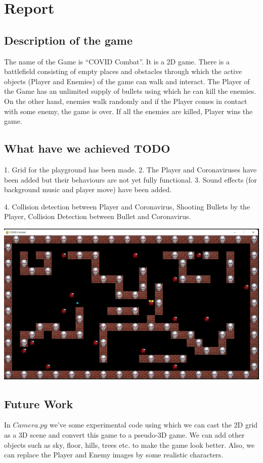 \chapter{Report}

\section{Description of the game}
The name of the Game is “COVID Combat”. It is a 2D game. There is a battlefield consisting of empty places and obstacles through which the active objects (Player and Enemies) of the game can walk and interact. The Player of the Game has an unlimited supply of bullets using which he can kill the enemies. On the other hand, enemies walk randomly and if the Player comes in contact with some enemy, the game is over. If all the enemies are killed, Player wins the game.

\section{What have we achieved TODO}
1.	Grid for the playground has been made.
2.	The Player and Coronaviruses have been added but their behaviours are not yet fully functional.
3.	Sound effects (for background music and player move) have been added.

4. Collision detection between Player and Coronavirus, Shooting Bullets by the Player, Collision Detection between Bullet and Coronavirus.


\includegraphics[scale=0.2]{snapshot}

\section{Future Work}
In $Camera.py$ we've some experimental code using which we can cast the 2D grid as a 3D scene and convert this game to a pseudo-3D game. We can add other objects such as sky, floor, hills, trees etc. to make the game look better. Also, we can replace the Player and Enemy images by some realistic characters.

